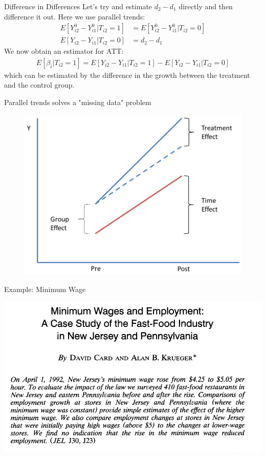 \begin{frame}{Difference in Differences} 
Let's try and estimate $d_2- d_1$ directly and then difference it out. Here we use \alert{parallel trends}:
\begin{align*}
E[Y_{i2}^0 - Y_{i1}^0 | T_{i2}=1]  &= E[Y_{i2}^0 - Y_{i1}^0 | T_{i2}=0] \\
E[Y_{i2} - Y_{i1} | T_{i2}=0] & = d_2-d_1
\end{align*}
We now obtain an estimator for ATT:
\begin{align*}
E[\beta_{i}| T_{i2}=1]  = E[Y_{i2} - Y_{i1} | T_{i2}=1] - E[Y_{i2} - Y_{i1} | T_{i2}=0]  
\end{align*}
which can be estimated by the difference in the growth between the treatment and the control group.
\end{frame}

\begin{frame}{Parallel trends solves a "missing data" problem}
\begin{figure}
\centering
\includegraphics[height=.8\textheight]{./resources/myDiD}
\end{figure}
\end{frame}

\begin{frame}{Example: Minimum Wage}

\includegraphics[height=.8\textheight]{./resources/CKAbstract}
\end{frame}

